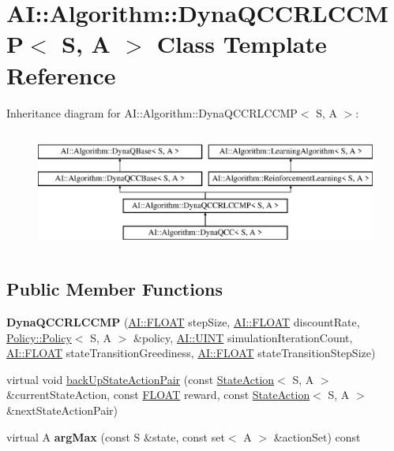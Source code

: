 \hypertarget{classAI_1_1Algorithm_1_1DynaQCCRLCCMP}{\section{A\-I\-:\-:Algorithm\-:\-:Dyna\-Q\-C\-C\-R\-L\-C\-C\-M\-P$<$ S, A $>$ Class Template Reference}
\label{classAI_1_1Algorithm_1_1DynaQCCRLCCMP}
}
Inheritance diagram for A\-I\-:\-:Algorithm\-:\-:Dyna\-Q\-C\-C\-R\-L\-C\-C\-M\-P$<$ S, A $>$\-:\begin{figure}[H]
\begin{center}
\leavevmode
\includegraphics[height=4.000000cm]{classAI_1_1Algorithm_1_1DynaQCCRLCCMP}
\end{center}
\end{figure}
\subsection*{Public Member Functions}
\begin{DoxyCompactItemize}
\item 
\hypertarget{classAI_1_1Algorithm_1_1DynaQCCRLCCMP_a892dd156f280dd375d7f248258531043}{{\bfseries Dyna\-Q\-C\-C\-R\-L\-C\-C\-M\-P} (\hyperlink{namespaceAI_a41b74884a20833db653dded3918e05c3}{A\-I\-::\-F\-L\-O\-A\-T} step\-Size, \hyperlink{namespaceAI_a41b74884a20833db653dded3918e05c3}{A\-I\-::\-F\-L\-O\-A\-T} discount\-Rate, \hyperlink{classAI_1_1Algorithm_1_1Policy_1_1Policy}{Policy\-::\-Policy}$<$ S, A $>$ \&policy, \hyperlink{namespaceAI_ab6e14dc1e659854858a87e511f1439ec}{A\-I\-::\-U\-I\-N\-T} simulation\-Iteration\-Count, \hyperlink{namespaceAI_a41b74884a20833db653dded3918e05c3}{A\-I\-::\-F\-L\-O\-A\-T} state\-Transition\-Greediness, \hyperlink{namespaceAI_a41b74884a20833db653dded3918e05c3}{A\-I\-::\-F\-L\-O\-A\-T} state\-Transition\-Step\-Size)}\label{classAI_1_1Algorithm_1_1DynaQCCRLCCMP_a892dd156f280dd375d7f248258531043}

\item 
virtual void \hyperlink{classAI_1_1Algorithm_1_1DynaQCCRLCCMP_aebff9b81db5bd2ae33bd3d6662539bc0}{back\-Up\-State\-Action\-Pair} (const \hyperlink{classAI_1_1StateAction}{State\-Action}$<$ S, A $>$ \&current\-State\-Action, const \hyperlink{namespaceAI_a41b74884a20833db653dded3918e05c3}{F\-L\-O\-A\-T} reward, const \hyperlink{classAI_1_1StateAction}{State\-Action}$<$ S, A $>$ \&next\-State\-Action\-Pair)
\item 
\hypertarget{classAI_1_1Algorithm_1_1DynaQCCRLCCMP_a145fa4fdba2289842a77c9d483a42ef2}{virtual A {\bfseries arg\-Max} (const S \&state, const set$<$ A $>$ \&action\-Set) const }\label{classAI_1_1Algorithm_1_1DynaQCCRLCCMP_a145fa4fdba2289842a77c9d483a42ef2}

\end{DoxyCompactItemize}
